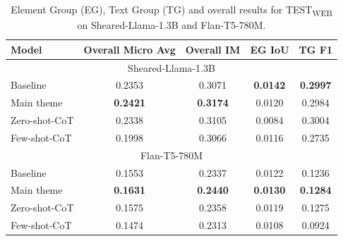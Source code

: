 \documentclass[11pt]{article}
\begin{document}
\begin{table}[h]
\centering
\caption{Element Group (EG), Text Group (TG) and overall results for TEST\textsubscript{WEB} on Sheared-Llama-1.3B and Flan-T5-780M.} \label{tab:table3}
\label{table:performance_test_web}
\begin{tabular}{|l|c|c|c|c|}
\hline
\textbf{Model} & \textbf{Overall Micro Avg} & \textbf{Overall IM} & \textbf{EG IoU} & \textbf{TG F1} \\ \hline\multicolumn{5}{|c|}{Sheared-Llama-1.3B}\\
\hline
Baseline & 0.2353 & 0.3071 & \textbf{0.0142} & \textbf{0.2997} \\  \hline
Main theme & \textbf{0.2421} & \textbf{0.3174} & 0.0120 & 0.2984 \\  \hline
Zero-shot-CoT & 0.2338 & 0.3105 & 0.0084 & 0.3004 \\  \hline
Few-shot-CoT & 0.1998 & 0.3066 & 0.0116 & 0.2735 \\  \hline\multicolumn{5}{|c|}{Flan-T5-780M}\\
\hline
Baseline & 0.1553 & 0.2337 & 0.0122 & 0.1236 \\  \hline
Main theme & \textbf{0.1631} & \textbf{0.2440} & \textbf{0.0130} & \textbf{0.1284} \\  \hline
Zero-shot-CoT & 0.1575 & 0.2358 & 0.0119 & 0.1275 \\  \hline
Few-shot-CoT & 0.1474 & 0.2313 & 0.0108 & 0.0924 \\ \hline
\end{tabular}
\end{table}
\end{document}

